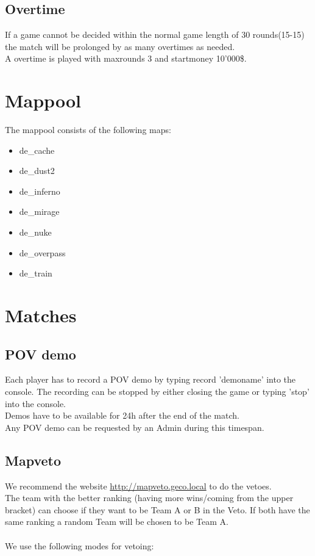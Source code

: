 \documentclass{article}
\begin{document}
\subsection{Overtime}
If a game cannot be decided within the normal game length of 30 rounds(15-15) the match will be prolonged by as many overtimes as needed.\\
A overtime is played with maxrounds 3 and startmoney 10'000\$.


\section{Mappool}
The mappool consists of the following maps:
\begin{itemize}
    \item de\_cache
    \item de\_dust2
    \item de\_inferno
    \item de\_mirage
    \item de\_nuke
    \item de\_overpass
    \item de\_train
\end{itemize}

\pagebreak
\section{Matches}

\subsection{POV demo}
Each player has to record a POV demo by typing record 'demoname' into the console.
The recording can be stopped by either closing the game or typing 'stop' into the console.\\
Demos have to be available for 24h after the end of the match.\\
Any POV demo can be requested by an Admin during this timespan.

\subsection{Mapveto}
We recommend the website \url{http://mapveto.geco.local} to do the vetoes.\\
The team with the better ranking (having more wins/coming from the upper bracket) can choose if they want to be Team A or B in the Veto. If both have the same ranking a random Team will be chosen to be Team A.\\
\\
We use the following modes for vetoing:\\
\end{document}
